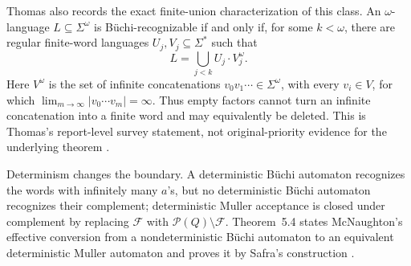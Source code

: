 Thomas also records the exact finite-union characterization of this class.  An
\(\omega\)-language \(L\subseteq\Sigma^\omega\) is B\"uchi-recognizable if and
only if, for some \(k<\omega\), there are regular finite-word languages
\(U_j,V_j\subseteq\Sigma^*\) such that
\[
 L=\bigcup_{j<k}U_j\cdot V_j^\omega.
\]
Here \(V^\omega\) is the set of infinite concatenations
\(v_0v_1\cdots\in\Sigma^\omega\), with every \(v_i\in V\), for which
\(\lim_{m\to\infty}|v_0\cdots v_m|=\infty\).  Thus empty factors cannot turn an
infinite concatenation into a finite word and may equivalently be deleted.
This is Thomas's report-level survey statement, not original-priority evidence
for the underlying theorem \cite[p.~30]{Thomas1996Report}.

Determinism changes the boundary.  A deterministic B\"uchi automaton recognizes
the words with infinitely many \(a\)'s, but no deterministic B\"uchi automaton
recognizes their complement; deterministic Muller acceptance is closed under
complement by replacing \(\mathcal F\) with
\(\mathcal P(Q)\setminus\mathcal F\).  Theorem~5.4 states McNaughton's
effective conversion from a nondeterministic B\"uchi automaton to an equivalent
deterministic Muller automaton and proves it by Safra's construction
\cite[\S5.2]{Thomas1996Report}.

